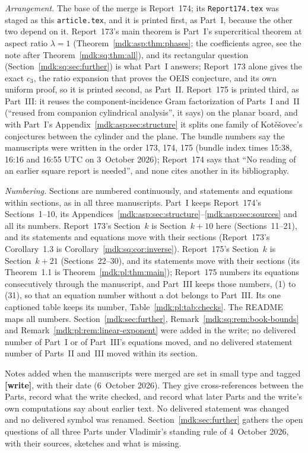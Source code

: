 \documentclass[11pt,letterpaper]{article}
\numberwithin{equation}{section}
\theoremstyle{remark}\newtheorem{remark}[theorem]{Remark}
\newcommand{\file}[1]{\nolinkurl{#1}}
\begin{document}
\emph{Arrangement.} The base of the merge is Report~174; its \file{Report174.tex} was staged as this \file{article.tex}, and it is printed first, as Part~I, because the other two depend on it. Report~173's main theorem is Part~I's supercritical theorem at aspect ratio $\lambda=1$ (Theorem~\ref{mdk:asp:thm:phases}; the coefficients agree, see the note after Theorem~\ref{mdk:sq:thm:all}), and its rectangular question (Section~\ref{mdk:sq:sec:further}) is what Part~I answers; Report~173 alone gives the exact $c_3$, the ratio expansion that proves the OEIS conjecture, and its own uniform proof, so it is printed second, as Part~II. Report~175 is printed third, as Part~III: it reuses the component-incidence Gram factorization of Parts~I and~II (``reused from companion cylindrical analysis'', it says) on the planar board, and with Part~I's Appendix~\ref{mdk:asp:sec:structure} it splits one family of Kot\v e\v sovec's conjectures between the cylinder and the plane. The bundle numbers say the manuscripts were written in the order 173, 174, 175 (bundle index times 15:38, 16:16 and 16:55 UTC on 3~October 2026); Report~174 says that ``No reading of an earlier square report is needed'', and none cites another in its bibliography.

\emph{Numbering.} Sections are numbered continuously, and statements and equations within sections, as in all three manuscripts. Part~I keeps Report~174's Sections~1--10, its Appendices~\ref{mdk:asp:sec:structure}--\ref{mdk:asp:sec:sources} and all its numbers. Report~173's Section~$k$ is Section~$k+10$ here (Sections~11--21), and its statements and equations move with their sections (Report~173's Corollary~1.3 is Corollary~\ref{mdk:sq:cor:inverse}). Report~175's Section~$k$ is Section~$k+21$ (Sections~22--30), and its statements move with their sections (its Theorem~1.1 is Theorem~\ref{mdk:pl:thm:main}); Report~175 numbers its equations consecutively through the manuscript, and Part~III keeps those numbers, (1) to (31), so that an equation number without a dot belongs to Part~III. Its one captioned table keeps its number, Table~\ref{mdk:pl:tab:checks}. The README maps all numbers. Section~\ref{mdk:sec:further}, Remark~\ref{mdk:sq:rem:book-bounds} and Remark~\ref{mdk:pl:rem:linear-exponent} were added in the write; no delivered number of Part~I or of Part~III's equations moved, and no delivered statement number of Parts~II and~III moved within its section.

Notes added when the manuscripts were merged are set in small type and tagged \textbf{[write]}, with their date (6~October 2026). They give cross-references between the Parts, record what the write checked, and record what later Parts and the write's own computations say about earlier text. No delivered statement was changed and no delivered symbol was renamed. Section~\ref{mdk:sec:further} gathers the open questions of all three Parts under Vladimir's standing rule of 4~October 2026, with their sources, sketches and what is missing.
\end{document}
